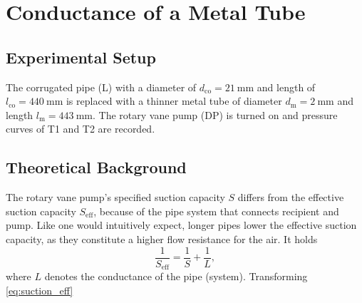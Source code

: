 \chapter{Conductance of a Metal Tube}
\section{Experimental Setup}
The corrugated pipe (L) with a diameter of $d_\text{co}=\SI{21}{\milli\meter}$ and length of $l_\text{co}=\SI{440}{\milli\meter}$ is replaced with a thinner metal tube of diameter $d_\text{m}=\SI{2}{\milli\meter}$ and length $l_\text{m}=\SI{443}{\milli\meter}$.
The rotary vane pump (DP) is turned on and pressure curves of T1 and T2 are recorded.

\section{Theoretical Background}
The rotary vane pump's specified suction capacity $S$ differs from the effective suction capacity $S_\text{eff}$, because of the pipe system that connects recipient and pump.
Like one would intuitively expect, longer pipes lower the effective suction capacity, as they constitute a higher flow resistance for the air.
It holds
\begin{equation}\label{eq:suction_eff}
	\frac{1}{S_\text{eff}}=\frac{1}{S}+\frac{1}{L},
\end{equation}
where $L$ denotes the conductance of the pipe (system).
Transforming \autoref{eq:suction_eff} 
